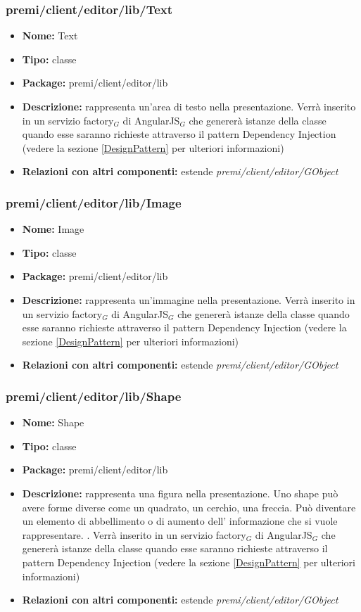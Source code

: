 \subsubsection{premi/client/editor/lib/Text}
\begin{itemize}
  \item[] \textbf{Nome:} Text
  \item[] \textbf{Tipo:} classe
  \item[] \textbf{Package:} premi/client/editor/lib
  \item[] \textbf{Descrizione:} rappresenta un'area di testo nella presentazione. Verrà inserito in un servizio factory$_G$ di AngularJS$_G$ che genererà istanze della classe quando esse saranno richieste attraverso il pattern Dependency Injection (vedere la sezione \ref{DesignPattern} per ulteriori informazioni)
  \item[] \textbf{Relazioni con altri componenti:} estende \textit{premi/client/editor/GObject}
\end{itemize}
\subsubsection{premi/client/editor/lib/Image}
\begin{itemize}
  \item[] \textbf{Nome:} Image
  \item[] \textbf{Tipo:} classe
  \item[] \textbf{Package:} premi/client/editor/lib
  \item[] \textbf{Descrizione:} rappresenta un'immagine nella presentazione. Verrà inserito in un servizio factory$_G$ di AngularJS$_G$ che genererà istanze della classe quando esse saranno richieste attraverso il pattern Dependency Injection (vedere la sezione \ref{DesignPattern} per ulteriori informazioni)
  \item[] \textbf{Relazioni con altri componenti:} estende \textit{premi/client/editor/GObject}
\end{itemize}
\subsubsection{premi/client/editor/lib/Shape}
\begin{itemize}
  \item[] \textbf{Nome:} Shape
  \item[] \textbf{Tipo:} classe
  \item[] \textbf{Package:} premi/client/editor/lib
  \item[] \textbf{Descrizione:} rappresenta una figura nella presentazione. Uno shape può avere forme diverse come un quadrato, un cerchio, una freccia. Può diventare un elemento di abbellimento o di aumento dell' informazione che si vuole rappresentare. . Verrà inserito in un servizio factory$_G$ di AngularJS$_G$ che genererà istanze della classe quando esse saranno richieste attraverso il pattern Dependency Injection (vedere la sezione \ref{DesignPattern} per ulteriori informazioni)
  \item[] \textbf{Relazioni con altri componenti:} estende \textit{premi/client/editor/GObject}
\end{itemize}
